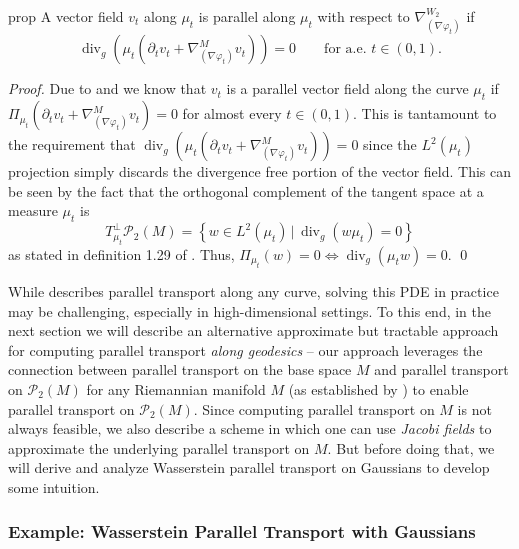 \documentclass[11pt]{article}
\newcommand{\man}{M}
\begin{document}
\begin{restatable}{prop}{} \label{Wasserstein parallel transport pde}
    A vector field $v_t$ along $\mu_t$ is parallel along $\mu_t$ with respect to $\nabla_{(\nabla\varphi_t)}^{W_2}$ if
    \[
    \operatorname{div}_g\!\left(\mu_t\left(\partial_t v_t
    + \nabla^M_{(\nabla \varphi_t)} v_t\right)\right)=0
    \qquad\text{for a.e. } t\in(0,1).
    \]
\end{restatable}
\noindent \textit{Proof.} Due to  and  we know that $v_t$ is a parallel vector field along the curve $\mu_t$ if $\Pi_{\mu_t}\left(\partial_tv_t + \nabla^M_{(\nabla \varphi_t)} v_t\right) = 0$ for almost every $t \in (0,1).$ This is tantamount to the requirement that $\operatorname{div}_g \left(\mu_t(\partial_tv_t + \nabla^M_{(\nabla \varphi_t)} v_t)\right) = 0$ since the $L^2(\mu_t)$ projection simply discards the divergence free portion of the vector field. This can be seen by the fact that the orthogonal complement of the tangent space at a measure $\mu_t$ is 
\[T^\perp_{\mu_t}\mathcal{P}_2(\man) = \left\{w \in L^2(\mu_t) 
\,\big | \, \operatorname{div}_g(w\mu_t) = 0\right\}\]
as stated in definition 1.29 of \citet{gigli2012second}. Thus, $\Pi_{\mu_t}(w) = 0 \iff \operatorname{div}_g(\mu_t w) = 0$.
\qed{}

While  describes parallel transport along any curve, solving this PDE in practice may be challenging, especially in high-dimensional settings. To this end, in the next section we will describe an alternative approximate but tractable approach for computing parallel transport \textit{along geodesics} -- our approach leverages the connection between parallel transport on the base space $\man$ and parallel transport on $\mathcal{P}_{2}(\man)$ for any Riemannian manifold $\man$ (as established by \citet{gigli2012second}) to enable parallel transport on $\mathcal{P}_2(\man)$. Since computing parallel transport on $M$ is not always feasible, we also describe a  scheme in which one can use \textit{Jacobi fields} to approximate the underlying parallel transport on $\man$. But before doing that, we will derive and analyze Wasserstein parallel transport on Gaussians to develop some intuition.

\subsubsection{Example: Wasserstein Parallel Transport with Gaussians} \label{sec: WPT with Gaussians}
\end{document}
